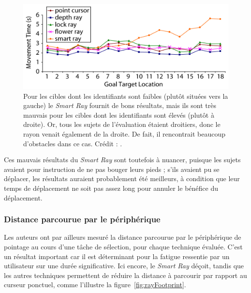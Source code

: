 	\begin{figure}[!htb]
		\centering
		\includegraphics[width=\textwidth]{figures/ch2/smartRayLocation}
		\caption[\emph{Smart Ray} et emplacement des cibles]{Pour les cibles dont les identifiants sont faibles (plutôt situées vers la gauche) le \emph{Smart Ray} fournit de bons résultats, mais ils sont très mauvais pour les cibles dont les identifiants sont élevés (plutôt à droite). Or, tous les sujets de l'évaluation étaient droitiers, donc le rayon venait également de la droite. De fait, il rencontrait beaucoup d'obstacles dans ce cas. Crédit : \cite{grossman2006design}.}
		\label{fig:smartRayLocation}
	\end{figure}

	Ces mauvais résultats du \emph{Smart Ray} sont toutefois à nuancer, puisque les sujets avaient pour instruction de ne pas bouger leurs pieds ; s'ils avaient pu se déplacer, les résultats auraient probablement été meilleurs, à condition que leur temps de déplacement ne soit pas assez long pour annuler le bénéfice du déplacement.
	
	\subsubsection{Distance parcourue par le périphérique}
	Les auteurs ont par ailleurs mesuré la distance parcourue par le périphérique de pointage au cours d'une tâche de sélection, pour chaque technique évaluée. C'est un résultat important car il est déterminant pour la fatigue ressentie par un utilisateur sur une durée significative. Ici encore, le \emph{Smart Ray} déçoit, tandis que les autres techniques permettent de réduire la distance à parcourir par rapport au curseur ponctuel, comme l'illustre la figure~\ref{fig:rayFootprint}.

